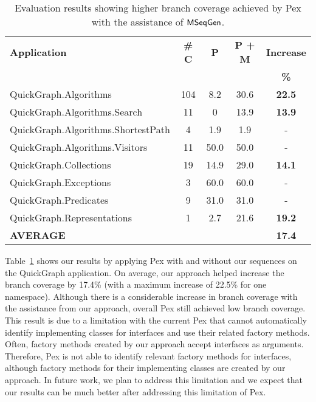 \setlength{\tabcolsep}{1pt}
\begin{table}[t]
\begin{SmallOut}
\begin{CodeOut}
\begin{center}
\begin {tabular} {|l|c|c|c|c|}
\hline
\textbf{Application} & \textbf{\# C} & \textbf{P} & \textbf{P + M} & \textbf{Increase}\\
 &  &  &  & \textbf{\%}\\
\hline
\hline QuickGraph.Algorithms & 104 & 8.2 & 30.6 & \textbf{22.5}\\
\hline QuickGraph.Algorithms.Search & 11 & 0 & 13.9 & \textbf{13.9}\\
\hline QuickGraph.Algorithms.ShortestPath & 4 & 1.9 & 1.9 & -\\
\hline QuickGraph.Algorithms.Visitors & 11 & 50.0 & 50.0 & -\\
\hline QuickGraph.Collections & 19 & 14.9 & 29.0 & \textbf{14.1}\\
\hline QuickGraph.Exceptions & 3 & 60.0 & 60.0 & -\\
\hline QuickGraph.Predicates & 9 & 31.0 & 31.0 & -\\
\hline QuickGraph.Representations & 1 & 2.7 & 21.6 & \textbf{19.2}\\
\hline \textbf{AVERAGE} &  & & & \textbf{17.4}\\
\hline
\end{tabular}
\end{center}
\end{CodeOut}
\end{SmallOut}\vspace*{-4ex}
\centering \caption {\label{tab:pexresults} Evaluation results showing higher branch coverage achieved by Pex with the assistance of $\textsf{MSeqGen} $. }\vspace*{-3ex}
\end{table}

Table~\ref{tab:pexresults} shows our results by applying Pex with and without our sequences on the QuickGraph application. On average, our approach helped increase the branch coverage by 17.4\% (with a maximum increase of 22.5\% for one namespace). Although there is a considerable increase in branch coverage with the assistance from our approach, overall Pex still achieved low branch coverage. This result is due to a limitation with the current Pex that cannot automatically identify implementing classes for interfaces and use their related factory methods. Often, factory methods created by our approach accept interfaces as arguments. Therefore, Pex is not able to identify relevant factory methods for interfaces, although factory methods for their implementing classes are created by our approach. In future work, we plan to address this limitation and we expect that our results can be much better after addressing this limitation of Pex.

